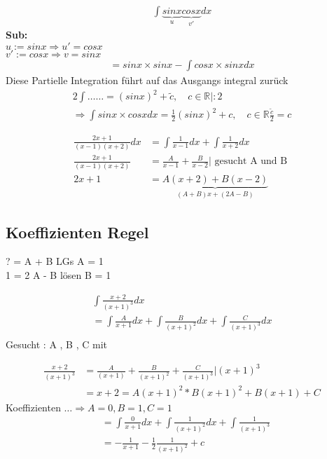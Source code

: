 \begin{example}
\begin{align*}
\int \underbrace{sinx}_{u} \underbrace{cosx}_{v'} dx 
\end{align*}
\textbf{Sub:}\\
$u  := sinx \Rightarrow u' = cosx$\\
$v' := cos x \Rightarrow v = sinx $
\begin{align*}
= sinx \times sinx - \int cos x \times sinx dx 
\end{align*}
Diese Partielle Integration führt auf das Ausgangs integral zurück
\begin{gather*}
2 \int \dots \dots = (sinx)^2 + \tilde{c} , \quad c \in \mathbb{R} | : 2\\
\Rightarrow \int sinx \times cos x dx = \frac{1}{2} (sin x )^2 + c , \quad c \in \mathbb{R} \frac{\tilde{c}}{2} = c
\end{gather*} 
\end{example}
\begin{example}
\begin{align*}
\frac{2x +1}{(x-1)(x+2)}dx &= \int \frac{1}{x-1}dx + \int \frac{1}{x+2}dx\\
\frac{2x+1}{(x-1)(x+2)} &= \frac{A}{x-1}+ \frac{B}{x-2} | \text{ gesucht A und B  }\\
2x+1 &= \underbrace{ A(x+2) + B(x-2)}_{(A+B)x+(2A-B)}  
\end{align*}
\subsection{Koeffizienten Regel}
? = A + B LGs A = 1 \\
1 = 2 A - B lösen B = 1
\end{example}
\begin{example}
\begin{gather*}
\int \frac{x+2}{(x+1)^3}dx \\
= \int \frac{A}{x+1}dx + \int \frac{B}{(x+1)^2}dx + \int \frac{C}{(x + 1)^3}dx\\
\end{gather*}
Gesucht : A , B , C mit 
\end{example}
\begin{align*}
\frac{ x + 2 }{(x+1)^3} &= \frac{A}{(x+1)} + \frac{B}{(x+1)^2} + \frac{C}{(x+1)^3} | (x+1)^3\\
&= x+2 = A(x+1)^2 * B(x+1)^2 + B(x+1) + C
\end{align*}
Koeffizienten $\dots \Rightarrow A = 0 , B = 1 , C = 1$
\begin{align*}
&= \int \frac{0}{x+1}dx + \int \frac{1}{(x+1)^2}dx + \int \frac{1}{(x+1)^3}\\
&= - \frac{1}{x+1} - \frac{1}{2} \frac{1}{(x+1)^2}+c
\end{align*}
